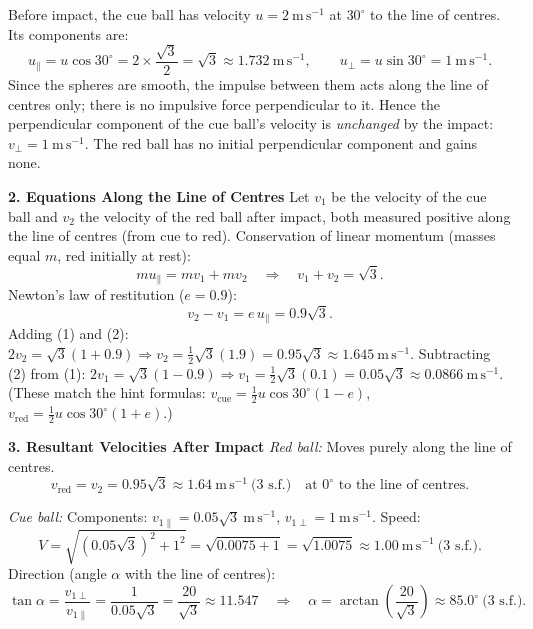 \documentclass[11pt]{article}
\newcommand{\cle}[1]{{\popxbold\color{popdark}#1}}
\begin{document}
\begin{exoresolu}
Before impact, the cue ball has velocity $u = 2\ \mathrm{m\,s^{-1}}$ at $30^{\circ}$ to the line of centres. Its components are:
\[ u_{\parallel} = u\cos 30^{\circ} = 2\times\frac{\sqrt{3}}{2} = \sqrt{3} \approx 1.732\ \mathrm{m\,s^{-1}}, \qquad u_{\perp} = u\sin 30^{\circ} = 1\ \mathrm{m\,s^{-1}}. \]
Since the spheres are \cle{smooth}, the impulse between them acts along the line of centres only; there is no impulsive force perpendicular to it. Hence the perpendicular component of the cue ball's velocity is \emph{unchanged} by the impact: $v_{\perp} = 1\ \mathrm{m\,s^{-1}}$. The red ball has no initial perpendicular component and gains none.

\textbf{2. Equations Along the Line of Centres}
Let $v_1$ be the velocity of the cue ball and $v_2$ the velocity of the red ball after impact, both measured positive along the line of centres (from cue to red).
Conservation of linear momentum (masses equal $m$, red initially at rest):
\[ m u_{\parallel} = m v_1 + m v_2 \quad\Longrightarrow\quad v_1 + v_2 = \sqrt{3}. \tag{1} \]
Newton's law of restitution ($e=0.9$):
\[ v_2 - v_1 = e\,u_{\parallel} = 0.9\sqrt{3}. \tag{2} \]
Adding (1) and (2): $2v_2 = \sqrt{3}(1+0.9) \Rightarrow v_2 = \tfrac{1}{2}\sqrt{3}(1.9) = 0.95\sqrt{3} \approx 1.645\ \mathrm{m\,s^{-1}}$.
Subtracting (2) from (1): $2v_1 = \sqrt{3}(1-0.9) \Rightarrow v_1 = \tfrac{1}{2}\sqrt{3}(0.1) = 0.05\sqrt{3} \approx 0.0866\ \mathrm{m\,s^{-1}}$.
(These match the hint formulas: $v_{\text{cue}} = \frac{1}{2}u\cos30^\circ(1-e)$, $v_{\text{red}} = \frac{1}{2}u\cos30^\circ(1+e)$.)

\textbf{3. Resultant Velocities After Impact}
\emph{Red ball:} Moves purely along the line of centres.
\[ v_{\text{red}} = v_2 = 0.95\sqrt{3} \approx \boxed{1.64\ \mathrm{m\,s^{-1}}}\ \text{(3 s.f.)} \quad\text{at } 0^{\circ} \text{ to the line of centres}. \]

\emph{Cue ball:} Components: $v_{1\parallel} = 0.05\sqrt{3}\ \mathrm{m\,s^{-1}}$, $v_{1\perp} = 1\ \mathrm{m\,s^{-1}}$.
Speed:
\[ V = \sqrt{(0.05\sqrt{3})^2 + 1^2} = \sqrt{0.0075 + 1} = \sqrt{1.0075} \approx \boxed{1.00\ \mathrm{m\,s^{-1}}}\ \text{(3 s.f.)}. \]
Direction (angle $\alpha$ with the line of centres):
\[ \tan\alpha = \frac{v_{1\perp}}{v_{1\parallel}} = \frac{1}{0.05\sqrt{3}} = \frac{20}{\sqrt{3}} \approx 11.547 \quad\Longrightarrow\quad \alpha = \arctan\left(\frac{20}{\sqrt{3}}\right) \approx \boxed{85.0^{\circ}}\ \text{(3 s.f.)}. \]
\end{exoresolu}
\end{document}
